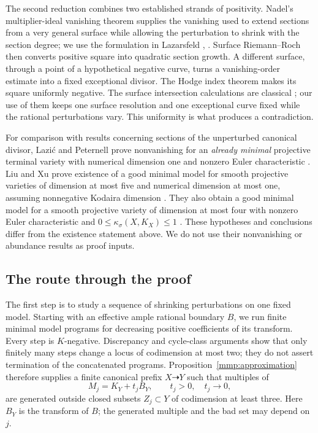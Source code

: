 The second reduction combines two established strands of positivity.
Nadel's multiplier-ideal vanishing theorem \cite{Nadel90} supplies the
vanishing used to extend sections from a very general surface while allowing the perturbation to shrink with the section degree;
we use the formulation in Lazarsfeld
\cite[Theorem~9.4.8]{Laz04II}, \cite[Theorem~2.4]{LazMI}.
Surface Riemann--Roch then converts positive square into quadratic section
growth. A different surface, through a point of a hypothetical negative
curve, turns a vanishing-order estimate into a fixed exceptional divisor.
The Hodge index theorem makes its square uniformly negative. The surface
intersection calculations are classical \cite[Chapter~V, Section~1]{Hartshorne77};
our use of them keeps one surface resolution and one exceptional curve fixed
while the rational perturbations vary. This uniformity is what produces a
contradiction.

For comparison with results concerning sections of the unperturbed
canonical divisor, Lazi\'c and Peternell prove nonvanishing for an
\emph{already minimal} projective terminal variety with numerical dimension
one and nonzero Euler characteristic \cite[Theorem~6.7]{LP18}.
Liu and Xu prove existence of a good minimal model for smooth projective
varieties of dimension at most five and numerical dimension at most one,
assuming nonnegative Kodaira dimension \cite[Theorem~1.2]{LiuXu25}.
They also obtain a good minimal model for a smooth projective variety of
dimension at most four with nonzero Euler characteristic and
\(0\leq\kappa_\sigma(X,K_X)\leq1\)
\cite[Corollary~5.2]{LiuXu25}.
These hypotheses and conclusions differ from the existence statement above.
We do not use their nonvanishing or abundance results as proof inputs.

\subsection{The route through the proof}

The first step is to study a sequence of shrinking perturbations on one
fixed model.
Starting with an effective ample rational boundary \(B\), we run finite
minimal model programs for decreasing positive coefficients of its
transform. Every step is \(K\)-negative. Discrepancy and cycle-class
arguments show that only finitely many steps change a locus of codimension
at most two; they do not assert termination of the concatenated programs.
Proposition~\ref{mmp:approximation} therefore supplies a finite canonical
prefix \(X\dashrightarrow Y\) such that multiples of
\[
M_j=K_Y+t_jB_Y,\qquad t_j>0,\quad t_j\longrightarrow0,
\]
are generated outside closed subsets \(Z_j\subset Y\) of codimension
at least three. Here \(B_Y\) is the transform of \(B\); the generated
multiple and the bad set may depend on \(j\).

